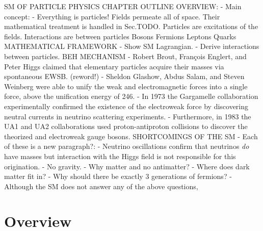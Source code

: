 

SM OF PARTICLE PHYSICS CHAPTER OUTLINE
OVERVIEW:
- Main concept:
- Everything is particles!
    Fields permeate all of space.
    Their mathematical treatment is handled in Sec.TODO.
    Particles are excitations of the fields.
    Interactions are between particles 
    Bosons
    Fermions
        Leptons
        Quarks
MATHEMATICAL FRAMEWORK
- Show SM Lagrangian.
- Derive interactions between particles.
    BEH MECHANISM
    - Robert Brout, François Englert, and Peter Higgs claimed that elementary particles acquire their masses via spontaneous EWSB. (reword!)
    - Sheldon Glashow, Abdus Salam, and Steven Weinberg were able to unify the weak and electromagnetic forces into a single force, above the unification energy of 246\GeV.
    - In 1973 the Gargamelle collaboration experimentally confirmed the existence of the electroweak force by discovering neutral currents in neutrino scattering experiments.
    - Furthermore, in 1983 the UA1 and UA2 collaborations used proton-antiproton collisions to discover the theorized \PW and \PZ electroweak gauge bosons.
SHORTCOMINGS OF THE SM
- Each of these is a new paragraph?:
- Neutrino oscillations confirm that neutrinos \emph{do} have masses but interaction with the Higgs field is not responsible for this origination.
- No gravity.
- Why matter and no antimatter?
- Where does dark matter fit in?
- Why should there be exactly 3 generations of fermions?
- Although the SM does not answer any of the above questions, 

\section{Overview}
\label{sec:sm_overview}

